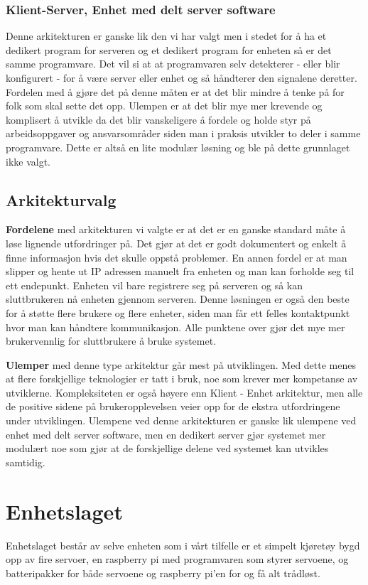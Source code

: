 \documentclass[12pt]{report}
\begin{document}
\subsection{Klient-Server, Enhet med delt server software}
Denne arkitekturen er ganske lik den vi har valgt men i stedet for å ha et dedikert program for serveren og et dedikert program for enheten så er det samme programvare. Det vil si at at programvaren selv detekterer - eller blir konfigurert - for å være server eller enhet og så håndterer den signalene deretter. Fordelen med å gjøre det på denne måten er at det blir mindre å tenke på for folk som skal sette det opp. Ulempen er at det blir mye mer krevende og komplisert å utvikle da det blir vanskeligere å fordele og holde styr på arbeidsoppgaver og ansvarsområder siden man i praksis utvikler to deler i samme programvare. Dette er altså en lite modulær løsning og ble på dette grunnlaget ikke valgt.

\section{Arkitekturvalg}
\textbf{Fordelene} med arkitekturen vi valgte er at det er en ganske standard måte å løse lignende utfordringer på. Det gjør at det er godt dokumentert og enkelt å finne informasjon hvis det skulle oppstå problemer. En annen fordel er at man slipper og hente ut IP adressen manuelt fra enheten og man kan forholde seg til ett endepunkt. Enheten vil bare registrere seg på serveren og så kan sluttbrukeren nå enheten gjennom serveren. Denne løsningen er også den beste for å støtte flere brukere og flere enheter, siden man får ett felles kontaktpunkt hvor man kan håndtere kommunikasjon. Alle punktene over gjør det mye mer brukervennlig for sluttbrukere å bruke systemet.

\textbf{Ulemper} med denne type arkitektur går mest på utviklingen. Med dette menes at flere forskjellige teknologier er tatt i bruk, noe som krever mer kompetanse av utviklerne. Kompleksiteten er også høyere enn Klient - Enhet arkitektur, men alle de positive sidene på brukeropplevelsen veier opp for de ekstra utfordringene under utviklingen. Ulempene ved denne arkitekturen er ganske lik ulempene ved enhet med delt server software, men en dedikert server gjør systemet mer modulært noe som gjør at de forskjellige delene ved systemet kan utvikles samtidig.


\chapter{Enhetslaget}
Enhetslaget består av selve enheten som i vårt tilfelle er et simpelt kjøretøy bygd opp av fire servoer, en raspberry pi med programvaren som styrer servoene, og batteripakker for både servoene og raspberry pi’en for og få alt trådløst.
\end{document}
